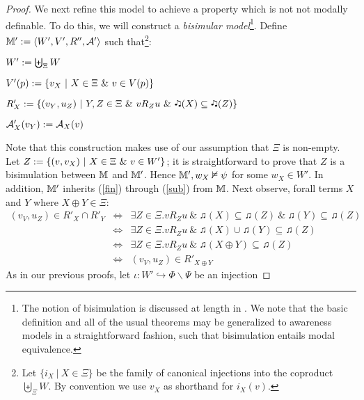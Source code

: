 \begin{proof}
  We next refine this model to achieve a property which is not
  not modally definable.  To do this, we will construct a \emph{bisimular model}{\footnote{The notion of bisimulation is
   discussed at length in {\cite[chapter 2.2]{blackburn_modal_2001}}.  We
  note that the basic definition and all of the usual theorems
  may be generalized to awareness models in a straightforward fashion,
  such that bisimulation entails modal equivalence. }}.  
  Define  $\mathbbm{M}' \assign \langle W', V', R'', \mathcal{A}' \rangle$ such
  that{\footnote{Let $\{i_X \  | \  X \in \Xi\}$ be the
  family of canonical injections into the coproduct $\biguplus_{\Xi}
  W$. By convention we use $v_X$ as shorthand for $i_X (v)$.}}:
  \begin{itemizedot}
    \item $W' \assign \biguplus_{\Xi} W$
    \item $V' (p) \assign \{v_X \  | \  X \in \Xi
    \  \& \  v \in V (p)\}$
    \item $R'_X \assign \{(v_Y, u_Z) \  | \  Y, Z \in \Xi
    \  \& \  v R_Z u \  \& \ 
    \twonotes (X) \subseteq \twonotes (Z)\}$
    \item $\mathcal{A}'_X(v_Y) \assign \mathcal{A}_{X} (v)$
  \end{itemizedot}
  Note that this construction makes use of our assumption that $\Xi$ is
  non-empty.  Let $Z \assign \{(v, v_X) \  | \  X \in \Xi
  \  \& \  v \in W' \}$; it is straightforward to prove
  that $Z$ is a bisimulation between $\mathbbm{M}$ and $\mathbbm{M}'$. Hence $\mathbbm{M}', w_X
  \nvDash \psi$ for some $w_X \in W'$.  In addition, $\mathbbm{M}'$
  inherits (\ref{fin}) through (\ref{sub}) from $\mathbbm{M}$.  Next
  observe, forall terms $X$ and $Y$ where $X \oplus Y \in \Xi$:
  \begin{eqnarray*}
    \text{$(v_V, u_Z) \in R'_X \cap R'_Y$} & \Longleftrightarrow & \exists Z
    \in \Xi . \text{$v R_Z u \  \& \  \twonotes (X)
    \subseteq \twonotes (Z) \  \& \  \twonotes (Y)
    \subseteq \twonotes (Z)$}\\
    & \Longleftrightarrow & \exists Z \in \Xi . \text{$v R_Z u \ 
    \& \  \twonotes (X) \cup \twonotes (Y) \subseteq \twonotes
    (Z)$}\\
    & \Longleftrightarrow & \exists Z \in \Xi . \text{$v R_Z u \ 
    \& \  \twonotes (X \oplus Y) \subseteq \twonotes (Z)$}\\
    & \Longleftrightarrow &  \text{$(v_V, u_Z) \in R'_{X \oplus Y}$}
  \end{eqnarray*}
  As in our previous proofs, let  $\iota : W' \hookrightarrow \Phi \backslash \Psi$ be an injection

\end{proof}
